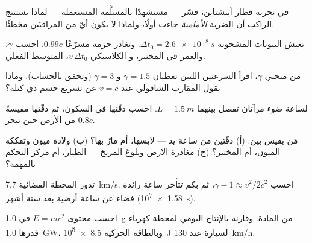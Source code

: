 \begin{exercise}[$\star$]\label{exo:g12:special-relativity:5}
في تجربة قطار أينشتاين، فسّر --- مستشهدًا بالمسلَّمة المستعملة ---
لماذا يستنتج الراكب أن الضربة \emph{الأمامية} جاءت أولًا، ولماذا
لا يكون أيّ من المراقبَين مخطئًا.
\end{exercise}

\begin{exercise}[$\star\star$]\label{exo:g12:special-relativity:6}
تعيش البيونات المشحونة $\Delta t_0 = \qty{2.6e-8}{s}$. وتغادر حزمة
مسرّعًا  $0.99c$. احسب $\gamma$، والعمر في المختبر، و
 الكلاسيكي $v\,\Delta t_0$،  المتوسط الفعلي.
\end{exercise}

\begin{exercise}[$\star\star$]\label{exo:g12:special-relativity:7}
من منحني $\gamma$، اقرأ السرعتين اللتين تعطيان $\gamma = 1.5$ و
$\gamma = 3$ (وتحقق بالحساب). وماذا يقول المقارب الشاقولي عند
$v = c$ عن تسريع جسم ذي كتلة؟
\end{exercise}

\begin{exercise}[$\star\star$]\label{exo:g12:special-relativity:8}
لساعة ضوء مرآتان تفصل بينهما $L = \qty{1.5}{m}$. احسب دقّتها في
السكون، ثم دقّتها مقيسةً من الأرض حين تبحر  $0.8c$.
\end{exercise}

\begin{exercise}[$\star\star$]\label{exo:g12:special-relativity:9}
مَن يقيس  بين: (أ) دقّتين من ساعة يد --- لابسها،
أم مارّ بها؟ (ب) ولادة ميون وتفككه --- الميون، أم
المختبر؟ (ج) مغادرة الأرض وبلوغ المريخ --- الطيار، أم مركز التحكم بالمهمة؟
\end{exercise}

\begin{exercise}[$\star\star$]\label{exo:g12:special-relativity:10}
تدور المحطة الفضائية  \qty{7.7}{km/s}. احسب
$\gamma - 1 \approx v^2/2c^2$، ثم بكم تتأخر ساعة رائدة فضاء
عن ساعة أرضية بعد ستة أشهر (\qty{1.58e7}{s}).
\end{exercise}

\begin{exercise}[$\star\star$]\label{exo:g12:special-relativity:11}
احسب محتوى  $E = mc^2$ في \qty{1.0}{g} من المادة. وقارنه
بالإنتاج اليومي لمحطة كهرباء قدرها \qty{1.0}{GW}، وبالطاقة الحركية
\qty{8.5e5}{J} لسيارة عند \qty{130}{km/h}.
\end{exercise}

